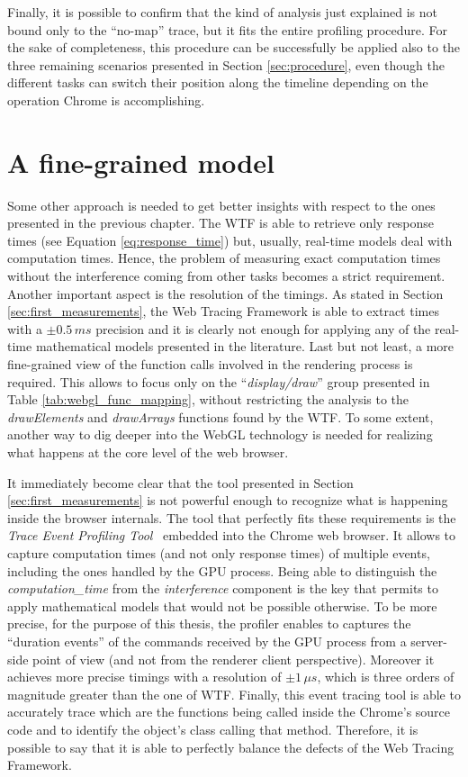 Finally, it is possible to confirm that the kind of analysis just explained is
not bound only to the ``no-map'' trace, but it fits the entire profiling
procedure. For the sake of completeness, this procedure can be successfully be
applied also to the three remaining
scenarios presented in Section \ref{sec:procedure}, even though the different
tasks can switch their position along the timeline depending on the operation
Chrome is accomplishing.


\section{A fine-grained model}
Some other approach is needed to get better insights with respect to the ones
presented in the previous chapter. The WTF is able to retrieve only response
times (see Equation \ref{eq:response_time}) but, usually, real-time models
deal with computation times.
Hence, the problem of measuring exact computation
times without the interference coming from other tasks becomes a strict requirement.
Another important aspect is the resolution of the timings. As stated in Section
\ref{sec:first_measurements}, the Web Tracing Framework is able to extract times with a
\( \pm 0.5\,ms \) precision and it is clearly not enough for applying any of
the real-time mathematical models presented in the literature.
Last but not least, a more fine-grained view of the function calls involved in
the rendering process is required. This allows to focus only on the
``\emph{display/draw}'' group presented in Table \ref{tab:webgl_func_mapping},
without restricting the analysis to the \emph{drawElements} and \emph{drawArrays}
functions found by the WTF. To some extent, another way to dig deeper into the
WebGL technology is needed for realizing what happens at the core level of the
web browser.

It immediately become clear that the tool presented in Section \ref{sec:first_measurements}
is not powerful enough to recognize what is happening inside the browser internals.
The tool that perfectly fits these requirements is the \emph{Trace Event Profiling
Tool}~\cite{eventprofilertool} embedded into the Chrome web browser.
It allows to capture computation times (and not only response times) of multiple
events, including the ones handled by the GPU process. Being able to distinguish
the \emph{computation\_time} from the \emph{interference} component is the key
that permits to apply mathematical models that would not be possible otherwise.
To be more precise, for the purpose of this thesis,
the profiler enables to captures the ``duration events'' of the commands received by the GPU
process from a server-side point of view (and not from the renderer client perspective).
Moreover it achieves more precise timings with a resolution of \(\pm 1\,\mu s\),
which is three orders of magnitude greater than the one of WTF.
Finally, this event tracing tool is able to accurately trace which are the functions
being called inside the Chrome's source code and to identify the object's class
calling that method. Therefore, it is possible to say that it is able to perfectly
balance the defects of the Web Tracing Framework.

